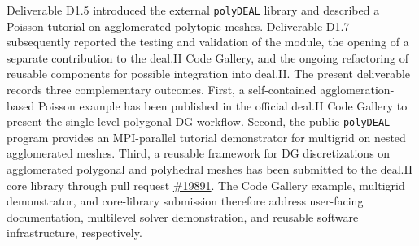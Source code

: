 \documentclass[a4paper,12pt]{article}
\begin{document}

Deliverable D1.5 introduced the external \texttt{polyDEAL} library and
described a Poisson tutorial on agglomerated polytopic meshes. Deliverable
D1.7 subsequently reported the testing and validation of the module, the
opening of a separate contribution to the deal.II Code Gallery, and the
ongoing refactoring of reusable components for possible integration into
deal.II. The present deliverable records three complementary outcomes. First,
a self-contained agglomeration-based Poisson example has been published in the
official deal.II Code Gallery to present the single-level polygonal DG
workflow.
Second, the public \texttt{polyDEAL} program
provides an MPI-parallel tutorial demonstrator for multigrid on nested
agglomerated meshes.
Third,
a reusable framework for DG discretizations on agglomerated polygonal and
polyhedral meshes has been submitted to the deal.II core library through pull
request \href{https://github.com/dealii/dealii/pull/19891}{\#19891}. The Code Gallery example, multigrid demonstrator, and
core-library submission therefore address user-facing documentation,
multilevel solver demonstration, and reusable software infrastructure,
respectively.
\end{document}
